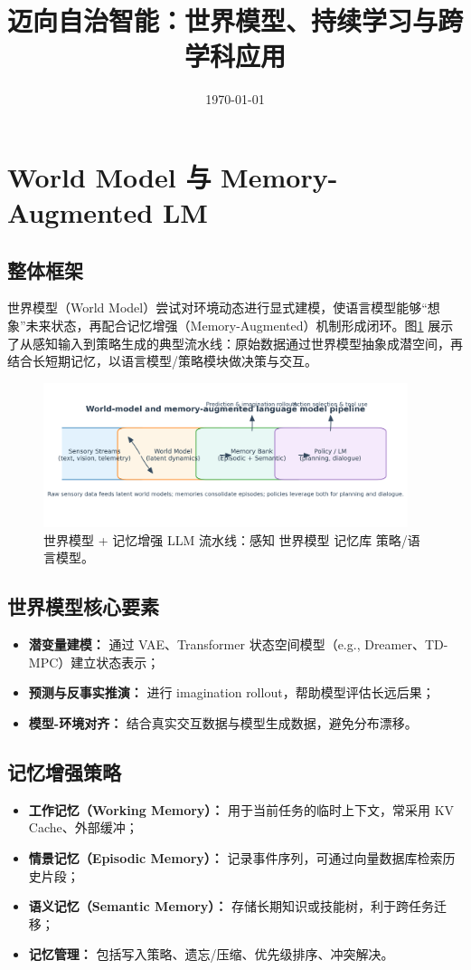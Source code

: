 \documentclass[UTF8,zihao=-4]{ctexart}
\title{迈向自治智能：世界模型、持续学习与跨学科应用}
\author{}
\date{\today}
\begin{document}
\maketitle

\section{World Model 与 Memory-Augmented LM}
\subsection{整体框架}
世界模型（World Model）尝试对环境动态进行显式建模，使语言模型能够“想象”未来状态，再配合记忆增强（Memory-Augmented）机制形成闭环。图\ref{fig:world_model_pipeline_cn} 展示了从感知输入到策略生成的典型流水线：原始数据通过世界模型抽象成潜空间，再结合长短期记忆，以语言模型/策略模块做决策与交互。
\begin{figure}[H]
  \centering
  \includegraphics[width=0.95\textwidth]{world_model_pipeline.png}
  \caption{世界模型 + 记忆增强 LLM 流水线：感知 \textrightarrow{} 世界模型 \textrightarrow{} 记忆库 \textrightarrow{} 策略/语言模型。}
  \label{fig:world_model_pipeline_cn}
\end{figure}

\subsection{世界模型核心要素}
\begin{itemize}
  \item \textbf{潜变量建模：} 通过 VAE、Transformer 状态空间模型（e.g., Dreamer、TD-MPC）建立状态表示；
  \item \textbf{预测与反事实推演：} 进行 imagination rollout，帮助模型评估长远后果；
  \item \textbf{模型-环境对齐：} 结合真实交互数据与模型生成数据，避免分布漂移。
\end{itemize}

\subsection{记忆增强策略}
\begin{itemize}
  \item \textbf{工作记忆（Working Memory）：} 用于当前任务的临时上下文，常采用 KV Cache、外部缓冲；
  \item \textbf{情景记忆（Episodic Memory）：} 记录事件序列，可通过向量数据库检索历史片段；
  \item \textbf{语义记忆（Semantic Memory）：} 存储长期知识或技能树，利于跨任务迁移；
  \item \textbf{记忆管理：} 包括写入策略、遗忘/压缩、优先级排序、冲突解决。
\end{itemize}
\end{document}
